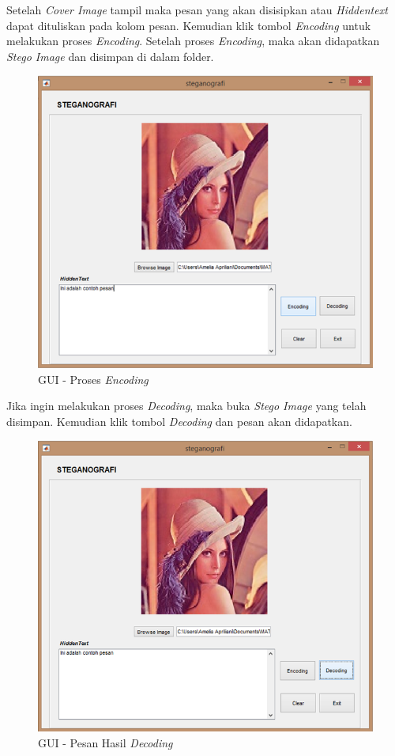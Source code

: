 	Setelah \emph{Cover Image} tampil maka pesan yang akan disisipkan atau \emph{Hiddentext} dapat dituliskan pada kolom pesan. Kemudian klik tombol \emph{Encoding} untuk melakukan proses \emph{Encoding}. Setelah proses \emph{Encoding}, maka akan didapatkan \emph{Stego Image} dan disimpan di dalam folder.
	
	\begin{figure}[H]
		\centering
		\includegraphics[width=1\textwidth]{gambar/mockup/3}
		\caption{GUI - Proses \emph{Encoding}}
		\label{desain_encoding}
	\end{figure}

	Jika ingin melakukan proses \emph{Decoding}, maka buka \emph{Stego Image} yang telah disimpan. Kemudian klik tombol \emph{Decoding} dan pesan akan didapatkan.

	\begin{figure}[H]
		\centering
		\includegraphics[width=1\textwidth]{gambar/mockup/5}
		\caption{GUI - Pesan Hasil \emph{Decoding}}
		\label{desain_pesan}
	\end{figure}

